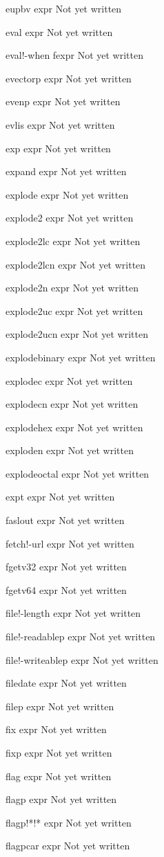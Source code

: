 \documentclass[a4paper,11pt]{article}
\begin{document}
\begin{description}
eupbv expr
Not yet written

eval expr
Not yet written

eval!-when fexpr
Not yet written

evectorp expr
Not yet written

evenp expr
Not yet written

evlis expr
Not yet written

exp expr
Not yet written

expand expr
Not yet written

explode expr
Not yet written

explode2 expr
Not yet written

explode2lc expr
Not yet written

explode2lcn expr
Not yet written

explode2n expr
Not yet written

explode2uc expr
Not yet written

explode2ucn expr
Not yet written

explodebinary expr
Not yet written

explodec expr
Not yet written

explodecn expr
Not yet written

explodehex expr
Not yet written

exploden expr
Not yet written

explodeoctal expr
Not yet written

expt expr
Not yet written

faslout expr
Not yet written

fetch!-url expr
Not yet written

fgetv32 expr
Not yet written

fgetv64 expr
Not yet written

file!-length expr
Not yet written

file!-readablep expr
Not yet written

file!-writeablep expr
Not yet written

filedate expr
Not yet written

filep expr
Not yet written

fix expr
Not yet written

fixp expr
Not yet written

flag expr
Not yet written

flagp expr
Not yet written

flagp!*!* expr
Not yet written

flagpcar expr
Not yet written


\end{description}
\end{document}
